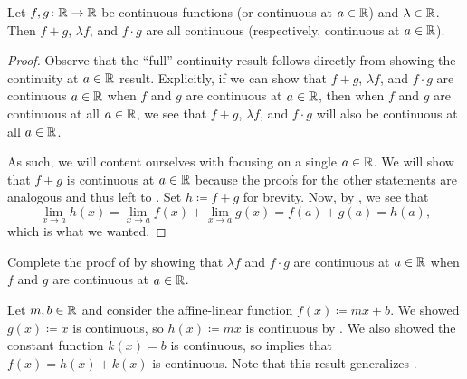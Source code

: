 \documentclass[../notes.tex]{subfiles}
\begin{document}
\begin{proposition} \label{prop:linear-combo-cont}
    Let $f, g\colon\mathbb R\to \mathbb R$ be continuous functions (or continuous at $a\in \mathbb R$) and $\lambda\in \mathbb R$. Then $f+g$, $\lambda f$, and $f\cdot g$ are all continuous (respectively, continuous at $a\in \mathbb R$). 
\end{proposition}
\begin{proof}
    Observe that the ``full'' continuity result follows directly from showing the continuity at $a\in\mathbb R$ result. Explicitly, if we can show that $f+g$, $\lambda f$, and $f\cdot g$ are continuous $a\in\mathbb R$ when $f$ and $g$ are continuous at $a\in\mathbb R$, then when $f$ and $g$ are continuous at all $a\in\mathbb R$, we see that $f+g$, $\lambda f$, and $f\cdot g$ will also be continuous at all $a\in\mathbb R$.

    As such, we will content ourselves with focusing on a single $a\in\mathbb R$. We will show that $f+g$ is continuous at $a\in\mathbb R$ because the proofs for the other statements are analogous and thus left to . Set $h\coloneqq f+g$ for brevity. Now, by , we see that
    \[\lim_{x\to a}h(x)=\lim_{x\to a}f(x)+\lim_{x\to a}g(x)=f(a)+g(a)=h(a),\]
    which is what we wanted.
\end{proof}
\begin{exe} \label{exe:complete-linear-combo-cont}
    Complete the proof of  by showing that $\lambda f$ and $f\cdot g$ are continuous at $a\in\mathbb R$ when $f$ and $g$ are continuous at $a\in\mathbb R$.
\end{exe}

\begin{example}
    Let $m, b\in \mathbb R$ and consider the affine-linear function $f(x)\coloneqq mx+b$. We showed $g(x)\coloneqq x$ is continuous, so $h(x)\coloneqq mx$ is continuous by . We also showed the constant function $k(x) = b$ is continuous, so  implies that $f(x) = h(x) +  k(x)$ is continuous. Note that this result generalizes .
\end{example}
\end{document}

